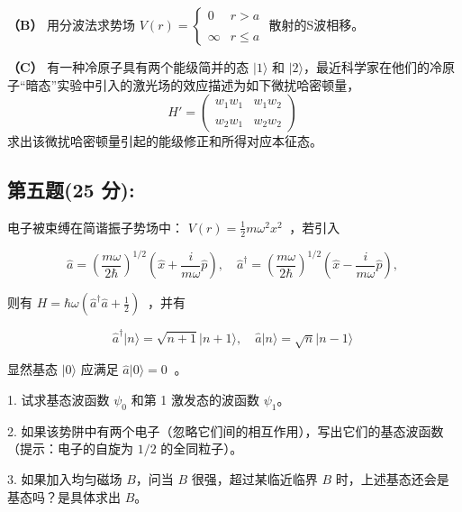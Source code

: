 \textbf{（B）} 用分波法求势场 $V(r) = 
\begin{cases}
 0 & r > a \\\\
\infty & r \leq a 
\end{cases}$ 散射的S波相移。

\textbf{（C）} 有一种冷原子具有两个能级简并的态 $|1\rangle$ 和 $|2\rangle$，最近科学家在他们的冷原子“暗态”实验中引入的激光场的效应描述为如下微扰哈密顿量，
$$H' = \begin{pmatrix} w_1 w_1 & w_1 w_2 \\\\ w_2 w_1 & w_2 w_2\end{pmatrix}~$$
求出该微扰哈密顿量引起的能级修正和所得对应本征态。
\subsection{第五题(25 分):}
电子被束缚在简谐振子势场中： \( V(r) = \frac{1}{2} m \omega^2 x^2 ~\) ，若引入

\[\hat{a} = \left(\frac{m \omega}{2 \hbar} \right)^{1/2} \left( \hat{x} + \frac{i}{m \omega} \hat{p} \right), \quad \hat{a}^\dagger = \left(\frac{m \omega}{2 \hbar} \right)^{1/2} \left( \hat{x} - \frac{i}{m \omega} \hat{p} \right),~\]

则有 \( H = \hbar \omega (\hat{a}^\dagger \hat{a} + \frac{1}{2}) ~\) ，并有

\[\hat{a}^\dagger \lvert n \rangle = \sqrt{n+1} \lvert n+1 \rangle , \quad \hat{a} \lvert n \rangle = \sqrt{n} \lvert n-1 \rangle ~\]

显然基态 \(\lvert 0 \rangle\) 应满足 \( \hat{a} \lvert 0 \rangle = 0 ~\) 。

1. 试求基态波函数 \( \psi_0 \) 和第 1 激发态的波函数 \( \psi_1 \)。

2. 如果该势阱中有两个电子（忽略它们间的相互作用），写出它们的基态波函数（提示：电子的自旋为 \(1/2\) 的全同粒子）。

3. 如果加入均匀磁场 \( B \)，问当 \( B \) 很强，超过某临近临界 \( B \) 时，上述基态还会是基态吗？是具体求出 \( B \)。


